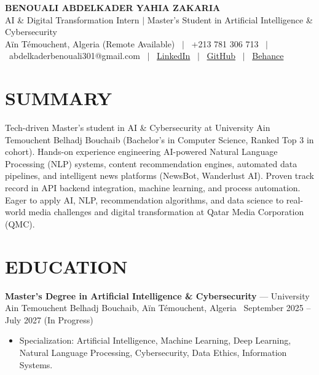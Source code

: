 \documentclass[10pt, letterpaper]{article}
\newcommand{\entry}[4]{%
  \noindent\textbf{#1} --- #3, #4 \textbar\ #2\par
  \vspace{0.5pt}
}
\newcommand{\resumeItem}[1]{\item #1}
\begin{document}
\linespread{0.93}\selectfont
\RaggedRight

\begin{center}
  {\LARGE \textbf{BENOUALI ABDELKADER YAHIA ZAKARIA}}\\[2pt]
  {\large AI \& Digital Transformation Intern $|$ Master's Student in Artificial Intelligence \& Cybersecurity}\\[2pt]
  Aïn Témouchent, Algeria (Remote Available) \ $|$ \ +213 781 306 713 \ $|$ \ abdelkaderbenouali301@gmail.com \ $|$ \ \href{https://www.linkedin.com/in/benouali-abdelkader-yahia-zakaria-4a917a247}{LinkedIn} \ $|$ \ \href{https://github.com/benoualiabdelkader}{GitHub} \ $|$ \ \href{https://www.behance.net/abdelkaderbeno}{Behance}
\end{center}

\vspace{-6pt}

\section{SUMMARY}
Tech-driven Master's student in AI \& Cybersecurity at University Ain Temouchent Belhadj Bouchaib (Bachelor's in Computer Science, Ranked Top 3 in cohort). Hands-on experience engineering AI-powered Natural Language Processing (NLP) systems, content recommendation engines, automated data pipelines, and intelligent news platforms (NewsBot, Wanderlust AI). Proven track record in API backend integration, machine learning, and process automation. Eager to apply AI, NLP, recommendation algorithms, and data science to real-world media challenges and digital transformation at Qatar Media Corporation (QMC).

\section{EDUCATION}

\entry{Master's Degree in Artificial Intelligence \& Cybersecurity}{September 2025 -- July 2027 (In Progress)}{University Ain Temouchent Belhadj Bouchaib}{Aïn Témouchent, Algeria}
\begin{itemize}
  \resumeItem{Specialization: Artificial Intelligence, Machine Learning, Deep Learning, Natural Language Processing, Cybersecurity, Data Ethics, Information Systems.}
\end{itemize}
\end{document}
